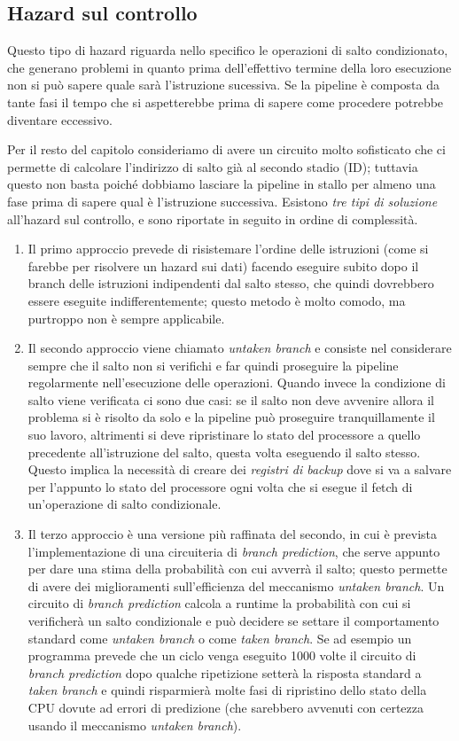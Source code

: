 \documentclass[class=book, crop=false, oneside]{standalone}
\begin{document}
\subsection{Hazard sul controllo}
Questo tipo di hazard riguarda nello specifico le operazioni di salto condizionato, che generano problemi in quanto prima dell'effettivo termine della loro esecuzione non si può sapere quale sarà l'istruzione sucessiva. Se la pipeline è composta da tante fasi il tempo che si aspetterebbe prima di sapere come procedere potrebbe diventare eccessivo.

Per il resto del capitolo consideriamo di avere un circuito molto sofisticato che ci permette di calcolare l’indirizzo di salto già al secondo stadio (ID); tuttavia questo non basta poiché dobbiamo lasciare la pipeline in stallo per almeno una fase prima di sapere qual è l'istruzione successiva. Esistono \emph{tre tipi di soluzione} all'hazard sul controllo, e sono riportate in seguito in ordine di complessità.

\begin{enumerate}
	\item Il primo approccio prevede di risistemare l'ordine delle istruzioni (come si farebbe per risolvere un hazard sui dati) facendo eseguire subito dopo il branch delle istruzioni indipendenti dal salto stesso, che quindi dovrebbero essere eseguite indifferentemente; questo metodo è molto comodo, ma purtroppo non è sempre applicabile.
	\item Il secondo approccio viene chiamato \emph{untaken branch} e consiste nel considerare sempre che il salto non si verifichi e far quindi proseguire la pipeline regolarmente nell'esecuzione delle operazioni. Quando invece la condizione di salto viene verificata ci sono due casi: se il salto non deve avvenire allora il problema si è risolto da solo e la pipeline può proseguire tranquillamente il suo lavoro, altrimenti si deve ripristinare lo stato del processore a quello precedente all'istruzione del salto, questa volta eseguendo il salto stesso. Questo implica la necessità di creare dei \emph{registri di backup} dove si va a salvare per l'appunto lo stato del processore ogni volta che si esegue il fetch di un'operazione di salto condizionale.
	\item Il terzo approccio è una versione più raffinata del secondo, in cui è prevista l'implementazione di una circuiteria di \emph{branch prediction}, che serve appunto per dare una stima della probabilità con cui avverrà il salto; questo permette di avere dei miglioramenti sull'efficienza del meccanismo \emph{untaken branch}. Un circuito di \emph{branch prediction} calcola a runtime la probabilità con cui si verificherà un salto condizionale e può decidere se settare il comportamento standard come \emph{untaken branch} o come \emph{taken branch}. Se ad esempio un programma prevede che un ciclo venga eseguito 1000 volte il circuito di \emph{branch prediction} dopo qualche ripetizione setterà la risposta standard a \emph{taken branch} e quindi risparmierà molte fasi di ripristino dello stato della CPU dovute ad errori di predizione (che sarebbero avvenuti con certezza usando il meccanismo \emph{untaken branch}).
\end{enumerate}
\end{document}
